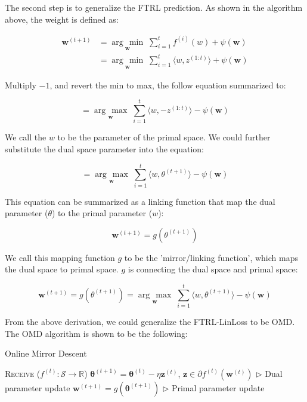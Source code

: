 \documentclass[11pt]{article}
\newcommand{\argmin}[1]{\underset{#1}{\operatorname{arg}\,\operatorname{min}}\;}
\newcommand{\argmax}[1]{\underset{#1}{\operatorname{arg}\,\operatorname{max}}\;}
\begin{document}
The second step is to generalize the FTRL prediction. As shown in the algorithm above, the weight is defined as:

\begin{align*}
    \bm{w}^{(t+1)} &= \argmin{\bm{w}} \sum^{t}_{i=1} f^{(i)}(w) + \psi (\bm{w})\\
    &= \argmin{\bm{w}} \sum^{t}_{i=1} \langle w,z^{(1:t)} \rangle + \psi (\bm{w})
\end{align*}
    

Multiply $-1$, and revert the min to max, the follow equation summarized to:

\begin{equation*}
    = \argmax{\bm{w}} \sum^{t}_{i=1} \langle w, -z^{(1:t)} \rangle - \psi (\bm{w})
\end{equation*}

We call the $w$ to be the parameter of the primal space.  We could further substitute the dual space parameter into the equation:

\begin{equation*}
     = \argmax{\bm{w}} \sum^{t}_{i=1} \langle w, \theta^{(t+1)} \rangle - \psi (\bm{w})
\end{equation*}

This equation can be summarized as a linking function that map the dual parameter ($\theta$) to the primal parameter ($w$):

\begin{equation*}
   \bm{w}^{(t+1)} = g(\theta^{(t+1)})
\end{equation*}

We call this mapping function $g$ to be the 'mirror/linking function', which maps the dual space to primal space. $g$ is connecting the dual space and primal space:

\begin{equation*}
   \bm{w}^{(t+1)} = g(\theta^{(t+1)}) = \argmax{\bm{w}} \sum^{t}_{i=1} \langle w, \theta^{(t+1)} \rangle - \psi (\bm{w})
\end{equation*}

From the above derivation, we could generalize the FTRL-LinLoss to be OMD. The OMD algorithm is shown to be the following:

\begin{algorithm}
  \caption{Online Mirror Descent}
  \label{algo:omd}
  \begin{algorithmic}[1]
            \STATE \textsc{Receive} ($f^{(t)}:\mathcal{S}\rightarrow \mathbb{R}$)
            \STATE $\bm{\theta}^{(t+1)} = \bm{\theta}^{(t)} - \eta \bm{z}^{(t)}$, $\bm{z} \in \partial f^{(t)}(\bm{w}^{(t)})$
            \hfill $\triangleright$ Dual parameter update
            \STATE $\bm{w}^{(t+1)} = g(\bm{\theta}^{(t+1)})$
            \hfill $\triangleright$ Primal parameter update
        \ENDFOR

  \end{algorithmic}
\end{algorithm}
\end{document}

